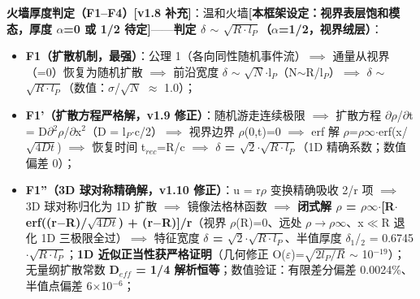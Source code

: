 \documentclass[12pt]{article}
\newcommand{\mtag}[1]{\textbf{[#1]}}
\newcommand{\up}[1]{\ensuremath{^{#1}}}
\newcommand{\down}[1]{\ensuremath{_{#1}}}
\begin{document}
\textbf{火墙厚度判定（F1--F4）\mtag{v1.8 补充}}：温和火墙\mtag{本框架设定：视界表层饱和模态，厚度 \ensuremath{\alpha}=0 或 1/2 待定}------\textbf{判定 \ensuremath{\delta} \ensuremath{\sim} \ensuremath{\sqrt{R\cdot{}l\down{P}}}（\ensuremath{\alpha}=1/2，视界绒层）}：
\begin{itemize}
\item \textbf{F1（扩散机制，最强）}：公理 1（各向同性随机事件流）\ensuremath{\implies} 通量从视界（=0）恢复为随机扩散 \ensuremath{\implies} 前沿宽度 \ensuremath{\delta} \ensuremath{\sim} \ensuremath{\sqrt{N}}\ensuremath{\cdot}l\down{P}（N\ensuremath{\sim}R/l\down{P}）\ensuremath{\implies} \ensuremath{\delta} \ensuremath{\sim} \ensuremath{\sqrt{R\cdot{}l\down{P}}}（数值：\ensuremath{\sigma}/\ensuremath{\sqrt{N}} \ensuremath{\approx} 1.0）；
\item \textbf{F1'（扩散方程严格解，v1.9 修正）}：随机游走连续极限 \ensuremath{\implies} 扩散方程 \ensuremath{\partial}\ensuremath{\rho}/\ensuremath{\partial}t = D\ensuremath{\partial}\up{2}\ensuremath{\rho}/\ensuremath{\partial}x\up{2}（D = l\down{P}\ensuremath{\cdot}c/2）\ensuremath{\implies} 视界边界 \ensuremath{\rho}(0,t)=0 \ensuremath{\implies} erf 解 \ensuremath{\rho}=\ensuremath{\rho}\ensuremath{\infty}\ensuremath{\cdot}erf(x/\ensuremath{\sqrt{4Dt}}) \ensuremath{\implies} 恢复时间 t\down{rec}=R/c \ensuremath{\implies} \textbf{\ensuremath{\delta} = \ensuremath{\sqrt{2}}\ensuremath{\cdot}\ensuremath{\sqrt{R\cdot{}l\down{P}}}}（1D 精确系数；数值偏差 0）；
\item \textbf{F1''（3D 球对称精确解，v1.10 修正）}：u = r\ensuremath{\rho} 变换精确吸收 2/r 项 \ensuremath{\implies} 3D 球对称归化为 1D 扩散 \ensuremath{\implies} 镜像法格林函数 \ensuremath{\implies} \textbf{闭式解 \ensuremath{\rho} = \ensuremath{\rho}\ensuremath{\infty}\ensuremath{\cdot}[R\ensuremath{\cdot}erf((r\ensuremath{-}R)/\ensuremath{\sqrt{4Dt}}) + (r\ensuremath{-}R)]/r}（视界 \ensuremath{\rho}(R)=0、远处 \ensuremath{\rho}\ensuremath{\to}\ensuremath{\rho}\ensuremath{\infty}、x\ensuremath{\ll}R 退化 1D 三极限全过）\ensuremath{\implies} 特征宽度 \textbf{\ensuremath{\delta} = \ensuremath{\sqrt{2}}\ensuremath{\cdot}\ensuremath{\sqrt{R\cdot{}l\down{P}}}}、半值厚度 \ensuremath{\delta}\down{1}/\down{2} = 0.6745\ensuremath{\cdot}\ensuremath{\sqrt{R\cdot{}l\down{P}}}；\textbf{1D 近似正当性获严格证明}（几何修正 O(\ensuremath{\varepsilon})=\ensuremath{\sqrt{2l\down{P}/R}} \ensuremath{\sim} 10\up{-19}）；无量纲扩散常数 \textbf{D\down{eff} = 1/4 解析恒等}；数值验证：有限差分偏差 0.0024\%、半值点偏差 6\ensuremath{\times}10\up{-6}；

\end{itemize}
\end{document}
